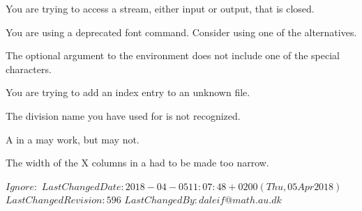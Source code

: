 \begin{plainlist}
\item[]

    You are trying to access a stream, either input or output, that is closed.


\item[]

    You are using a deprecated font command. Consider using one of the
alternatives.

\item[]

    The optional  argument to the  environment
does not include one of the special characters.

\item[]

    You are trying to add an index entry to an unknown  file.


\item[]

    The division name you have used for \cmd{\settocdepth} is not 
recognized.



\item[]

    A  in a  may work, but may not.

\item[] 

    The width of the X columns in a  had to be made too narrow.

\end{plainlist}



\svnidlong
{$Ignore: $}
{$LastChangedDate: 2018-04-05 11:07:48 +0200 (Thu, 05 Apr 2018) $}
{$LastChangedRevision: 596 $}
{$LastChangedBy: daleif@math.au.dk $}


